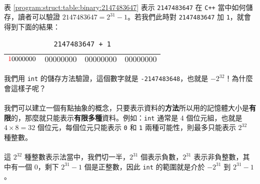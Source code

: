 \documentclass[12pt,a4paper,oneside]{article}
\begin{document}
\begin{CJK}{UTF8}{bkai}
\paragraph{}表 \ref{program:struct:table:binary:2147483647} 表示 \lstinline!2147483647! 在 \texttt{C++} 當中如何儲存，讀者可以驗證 $2147483647=2^{31}-1$。若我們此時對 \lstinline!2147483647! 加 \lstinline!1!，就會得到下面的結果：

\begin{table}[h!]
\centering
\begin{tabular}{|c|c|c|c|}
\hline
${\color{red}1}0000000$ & $00000000$ & $00000000$ & $00000000$\\
\hline
\end{tabular}
\caption{\lstinline!2147483647 + 1!}
\end{table}

\paragraph{}我們用 \lstinline!int! 的儲存方法驗證，這個數字就是 \lstinline!-2147483648!，也就是 $-2^{32}$！為什麼會這樣子呢？
\paragraph{}我們可以建立一個有點抽象的概念，只要表示資料的\textbf{方法}所以用的記憶體大小是\textbf{有限}的，那麼就只能表示\textbf{有限多種}資料。例如：\lstinline!int! 通常是 4 個位元組，也就是 $4\times{8}=32$ 個位元，每個位元只能表示 \lstinline!0! 和 \lstinline!1! 兩種可能性，則最多只能表示 $2^{32}$ 種整數。
\paragraph{}這 $2^{32}$ 種整數表示法當中，我們切一半，$2^{31}$ 個表示負數，$2^{31}$ 表示非負整數，其中有一個 $0$，剩下 $2^{31}-1$ 個是正整數，因此 \lstinline!int! 的範圍就是介於 $-2^{31}$ 到 $2^{31}-1$。


\end{CJK}
\end{document}
